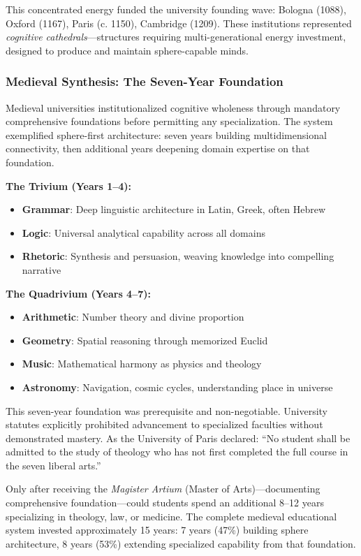 This concentrated energy funded the university founding wave: Bologna (1088), Oxford (1167), Paris (c. 1150), Cambridge (1209). These institutions represented \textit{cognitive cathedrals}---structures requiring multi-generational energy investment, designed to produce and maintain sphere-capable minds.

\subsubsection{Medieval Synthesis: The Seven-Year Foundation}

Medieval universities institutionalized cognitive wholeness through mandatory comprehensive foundations before permitting any specialization. The system exemplified sphere-first architecture: seven years building multidimensional connectivity, then additional years deepening domain expertise on that foundation.

\textbf{The Trivium (Years 1--4):}
\begin{itemize}
    \item \textbf{Grammar}: Deep linguistic architecture in Latin, Greek, often Hebrew
    \item \textbf{Logic}: Universal analytical capability across all domains
    \item \textbf{Rhetoric}: Synthesis and persuasion, weaving knowledge into compelling narrative
\end{itemize}

\textbf{The Quadrivium (Years 4--7):}
\begin{itemize}
    \item \textbf{Arithmetic}: Number theory and divine proportion
    \item \textbf{Geometry}: Spatial reasoning through memorized Euclid
    \item \textbf{Music}: Mathematical harmony as physics and theology
    \item \textbf{Astronomy}: Navigation, cosmic cycles, understanding place in universe
\end{itemize}

This seven-year foundation was prerequisite and non-negotiable. University statutes explicitly prohibited advancement to specialized faculties without demonstrated mastery. As the University of Paris declared: ``No student shall be admitted to the study of theology who has not first completed the full course in the seven liberal arts.''

Only after receiving the \textit{Magister Artium} (Master of Arts)---documenting comprehensive foundation---could students spend an additional 8--12 years specializing in theology, law, or medicine. The complete medieval educational system invested approximately 15 years: 7 years (47\%) building sphere architecture, 8 years (53\%) extending specialized capability from that foundation.

